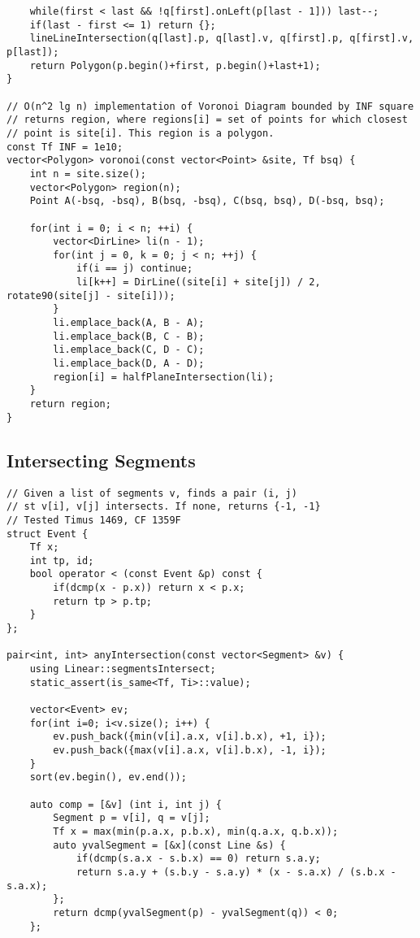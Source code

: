 \documentclass[FSZ,a4paper,onesided]{article}
\begin{document}
\begin{multicols*}{\COLS}
\begin{lstlisting}
    while(first < last && !q[first].onLeft(p[last - 1])) last--;
    if(last - first <= 1) return {};
    lineLineIntersection(q[last].p, q[last].v, q[first].p, q[first].v, p[last]);
    return Polygon(p.begin()+first, p.begin()+last+1);
}

// O(n^2 lg n) implementation of Voronoi Diagram bounded by INF square
// returns region, where regions[i] = set of points for which closest
// point is site[i]. This region is a polygon.
const Tf INF = 1e10;
vector<Polygon> voronoi(const vector<Point> &site, Tf bsq) {
    int n = site.size();
    vector<Polygon> region(n);
    Point A(-bsq, -bsq), B(bsq, -bsq), C(bsq, bsq), D(-bsq, bsq);

    for(int i = 0; i < n; ++i) {
        vector<DirLine> li(n - 1);
        for(int j = 0, k = 0; j < n; ++j) {
            if(i == j) continue;
            li[k++] = DirLine((site[i] + site[j]) / 2, rotate90(site[j] - site[i]));
        }
        li.emplace_back(A, B - A);
        li.emplace_back(B, C - B);
        li.emplace_back(C, D - C);
        li.emplace_back(D, A - D);
        region[i] = halfPlaneIntersection(li);
    }
    return region;
}\end{lstlisting}
\subsection{Intersecting Segments}
\begin{lstlisting}
// Given a list of segments v, finds a pair (i, j)
// st v[i], v[j] intersects. If none, returns {-1, -1}
// Tested Timus 1469, CF 1359F
struct Event {
    Tf x;
    int tp, id;
    bool operator < (const Event &p) const {
        if(dcmp(x - p.x)) return x < p.x;
        return tp > p.tp;
    }
};

pair<int, int> anyIntersection(const vector<Segment> &v) {
    using Linear::segmentsIntersect;
    static_assert(is_same<Tf, Ti>::value);

    vector<Event> ev;
    for(int i=0; i<v.size(); i++) {
        ev.push_back({min(v[i].a.x, v[i].b.x), +1, i});
        ev.push_back({max(v[i].a.x, v[i].b.x), -1, i});
    }
    sort(ev.begin(), ev.end());

    auto comp = [&v] (int i, int j) {
        Segment p = v[i], q = v[j];
        Tf x = max(min(p.a.x, p.b.x), min(q.a.x, q.b.x));
        auto yvalSegment = [&x](const Line &s) {
            if(dcmp(s.a.x - s.b.x) == 0) return s.a.y;
            return s.a.y + (s.b.y - s.a.y) * (x - s.a.x) / (s.b.x - s.a.x);
        };
        return dcmp(yvalSegment(p) - yvalSegment(q)) < 0;
    };


\end{lstlisting}
\end{multicols*}
\end{document}
